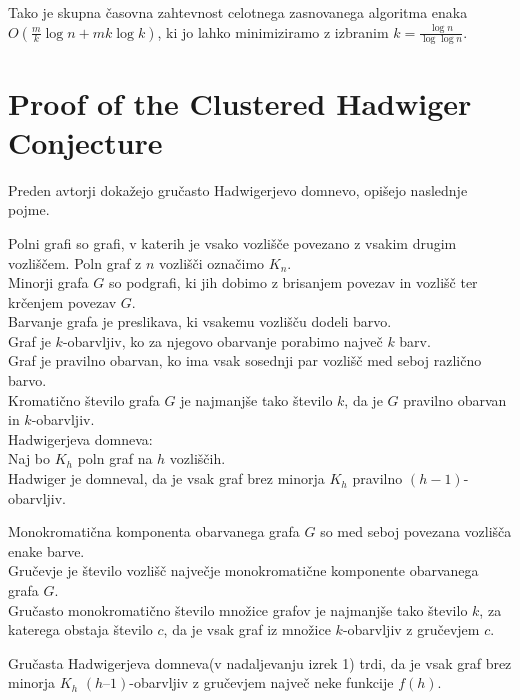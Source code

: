 \documentclass{article}
\begin{document}
Tako je skupna časovna zahtevnost celotnega zasnovanega algoritma enaka $O(\frac{m}{k}\log n + mk \log k)$, ki jo lahko minimiziramo z izbranim $k = \frac{\log n}{\log \log n}$.

\section{Proof of the Clustered Hadwiger Conjecture}
Preden avtorji dokažejo gručasto Hadwigerjevo domnevo, opišejo naslednje pojme.



Polni grafi so grafi, v katerih je vsako vozlišče povezano z vsakim drugim vozliščem. Poln graf z $n$ vozlišči označimo $K_n$.\\                                                           
Minorji grafa $G$ so podgrafi, ki jih dobimo z brisanjem povezav in vozlišč ter krčenjem povezav $G$.\\
Barvanje grafa je preslikava, ki vsakemu vozlišču dodeli barvo.\\
Graf je $k$-obarvljiv, ko za njegovo obarvanje porabimo največ $k$ barv.\\
Graf je pravilno obarvan, ko ima vsak sosednji par vozlišč med seboj različno barvo.\\
Kromatično število grafa $G$ je najmanjše tako število $k$, da je $G$ pravilno obarvan in $k$-obarvljiv.\\

Hadwigerjeva domneva:\\
Naj bo $K_h$ poln graf na $h$ vozliščih.\\
Hadwiger je domneval, da je vsak graf brez minorja $K_h$ pravilno $(h - 1)$-obarvljiv.

Monokromatična komponenta obarvanega grafa $G$ so med seboj povezana vozlišča enake barve.\\
Gručevje je število vozlišč največje monokromatične komponente obarvanega grafa $G$.\\
Gručasto monokromatično število množice grafov je najmanjše tako število $k$, za katerega obstaja število $c$, da je vsak graf iz množice $k$-obarvljiv z gručevjem $c$.

Gručasta Hadwigerjeva domneva(v nadaljevanju izrek 1) trdi, da je vsak graf brez minorja $K_h$ $(h – 1)$-obarvljiv z gručevjem največ neke funkcije $f(h)$.\\
\end{document}
